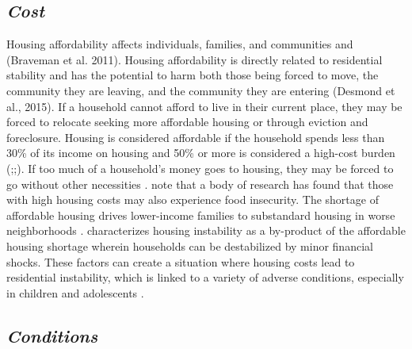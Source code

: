 \subsection{\textit{Cost}}
Housing affordability affects individuals, families, and communities and (Braveman et al. 2011). Housing affordability is directly related to residential stability and has the potential to harm both those being forced to move, the community they are leaving, and the community they are entering (Desmond et al., 2015). If a household cannot afford to live in their current place, they may be forced to relocate seeking more affordable housing or through eviction and foreclosure. Housing is considered affordable if the household spends less than 30\% of its income on housing and 50\% or more is considered a high-cost burden (\citealp{braveman_housing_2011};\citealp{swope_housing_2020};\citealp{weicher_housing_2006}).  If too much of a household’s money goes to housing, they may be forced to go without other necessities \citep{herbert_measuring_2018}. \citet{fletcher_assessing_2009}  note that a body of research has found that those with high housing costs may also experience food insecurity. The shortage of affordable housing drives lower-income families to substandard housing in worse neighborhoods \citep{braveman_housing_2011}. \citet{kang_severe_2021} characterizes housing instability as a by-product of the affordable housing shortage wherein households can be destabilized by minor financial shocks. These  factors can create a situation where housing costs lead to residential instability, which is linked to a variety of adverse conditions, especially in children and adolescents \citep{desmond_forced_2015}.  

\subsection{\textit{Conditions}}

